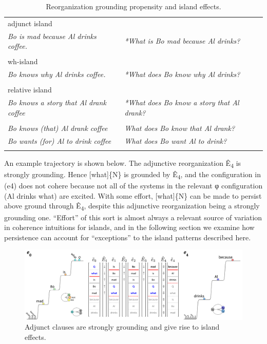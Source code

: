 \begin{table}
\small
\begin{tabularx}{\textwidth}{llQ}
\lsptoprule
{}\\
\midrule
adjunct island \\
\textit{Bo is mad because Al drinks coffee.} & \textit{*What is Bo mad because Al drinks?}\\
\\
wh-island\\
\textit{Bo knows why Al drinks coffee.} & \textit{*What does Bo know why Al drinks?}\\
\\
relative island\\
\textit{Bo knows a story that Al drank coffee} & \textit{*What does Bo know a story that Al drank?}\\
\tablevspace
{}\\
\midrule 
\textit{Bo knows (that) Al drank coffee} & \textit{What does Bo know that Al drank?}\\
\textit{Bo wants (for) Al to drink coffee} & \textit{What does Bo want Al to drink?}\\
\lspbottomrule
\end{tabularx}
\caption{Reorganization grounding propensity and island effects.}\label{tab:7:5}
\end{table}

  An example trajectory is shown below. The adjunctive reorganization Ê\textsubscript{4} is strongly grounding. Hence [what]\{N\} is grounded by Ê\textsubscript{4}, and the configuration in (e4) does not cohere because not all of the systems in the relevant φ configuration ({\textbar}Al drinks what{\textbar}) are excited. With some effort, [what]\{N\} can be made to persist above ground through Ê\textsubscript{4}, despite this adjunctive reorganization being a strongly grounding one. “Effort” of this sort is almost always a relevant source of variation in coherence intuitions for islands, and in the following section we examine how persistence can account for “exceptions” to the island patterns described here.

  
\begin{figure}
\includegraphics[width=\textwidth]{figures/Tilsen-img163.png}
\caption{Adjunct clauses are strongly grounding and give rise to island effects.}
\label{fig:7:19}
\end{figure}
 

